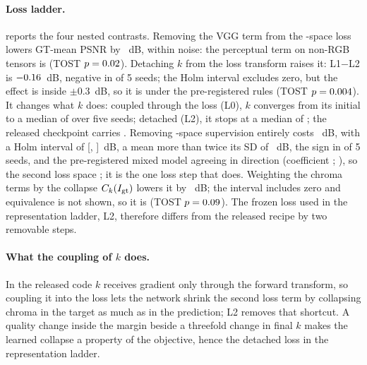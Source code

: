 \paragraph{Loss ladder.}  reports the four nested contrasts. Removing the VGG term from the \hvi-space loss lowers GT-mean PSNR by ~dB,
within noise: the perceptual term on non-RGB tensors is  (TOST
$p = 0.02$).
Detaching $k$ from the loss transform raises it: L1$-$L2 is $-0.16$~dB, negative in
 of 5 seeds;
the Holm interval excludes zero, but the effect is inside $\pm 0.3$~dB, so it is
 under the pre-registered rules (TOST $p = 0.004$). It changes what $k$ does: coupled through the loss (L0), $k$ converges from its initial
 to a median of  over five seeds; detached (L2), it stops at a median of
; the released checkpoint carries . Removing \hvi-space supervision entirely costs ~dB, with a Holm
interval of [, ]~dB, a mean more than twice its SD of ~dB,
the sign in  of 5 seeds, and the pre-registered mixed model agreeing in direction
(coefficient ; ), so the second loss space ; it is the one loss step that does. Weighting the \hvi chroma terms by the collapse $C_k(I_{\mathrm{gt}})$ lowers it by
~dB; the interval
includes zero and equivalence is not shown, so it is  (TOST
$p = 0.09$). The frozen loss used in the representation ladder, L2, therefore differs from the released
recipe by two removable steps.

\paragraph{What the coupling of $k$ does.} In the released code $k$ receives gradient only
through the forward transform, so coupling it into the loss lets the network shrink the
second loss term by collapsing chroma in the target as much as in the prediction; L2 removes
that shortcut. A quality change inside the margin beside a threefold change in final $k$ makes the learned
collapse a property of the objective, hence the detached loss in the representation ladder.



